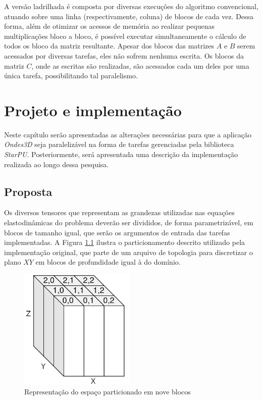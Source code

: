 \documentclass[cic,tc]{iiufrgs}
\begin{document}
A versão ladrilhada é composta por diversas execuções do algoritmo convencional, atuando sobre uma linha (respectivamente, coluna) de blocos de cada vez. Dessa forma, além de otimizar os
acessos de memória ao realizar pequenas multiplicações bloco a bloco, é possível executar simultaneamente o cálculo de todos os bloco da matriz resultante. Apesar dos blocos das matrizes
$A$ e $B$ serem acessados por diversas tarefas, eles não sofrem nenhuma escrita. Os blocos da matriz $C$, onde as escritas são realizadas, são acessados cada um deles por uma única tarefa,
possibilitando tal paralelismo.

\chapter{Projeto e implementação}
Neste capítulo serão apresentadas as alterações necessárias para que a aplicação \textit{Ondes3D} seja paralelizável na forma de tarefas gerenciadas pela biblioteca \textit{StarPU}.
Posteriormente, será apresentada uma descrição da implementação realizada ao longo dessa pesquisa.

\section{Proposta}\label{sec:proposal}

Os diversos tensores que representam as grandezas utilizadas nas equações elastodinâmicas do problema deverão ser divididos, de forma parametrizável, em blocos de tamanho igual, que serão os argumentos de entrada das tarefas implementadas.
A Figura \ref{fig:cuboids} ilustra o particionamento descrito utilizado pela implementação original, que parte de um arquivo de topologia para discretizar o plano $XY$ em blocos de profundidade
igual à do domínio.

\begin{figure}[!htb]
    \caption{Representação do espaço particionado em nove blocos}
    \begin{center}
      \includegraphics[width=15em]{cuboids}
    \end{center}
    \label{fig:cuboids}
\end{figure}
\end{document}
